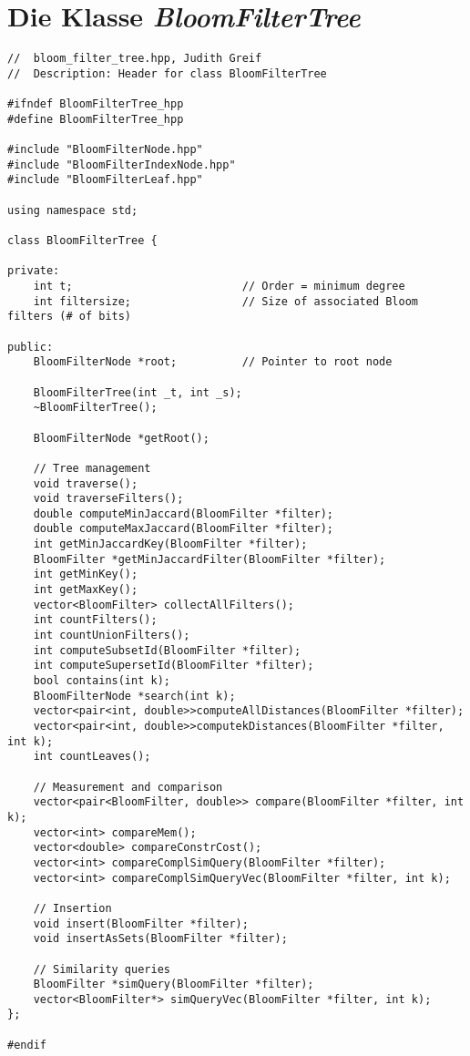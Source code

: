 \section{Die Klasse \textit{BloomFilterTree}}\label{sec:BloomFilterTree.hpp}
\small{
\begin{verbatim}
//  bloom_filter_tree.hpp, Judith Greif
//  Description: Header for class BloomFilterTree

#ifndef BloomFilterTree_hpp
#define BloomFilterTree_hpp

#include "BloomFilterNode.hpp"
#include "BloomFilterIndexNode.hpp"
#include "BloomFilterLeaf.hpp"

using namespace std;

class BloomFilterTree {
    
private:
    int t;                          // Order = minimum degree
    int filtersize;                 // Size of associated Bloom filters (# of bits)
    
public:
    BloomFilterNode *root;          // Pointer to root node
    
    BloomFilterTree(int _t, int _s);
    ~BloomFilterTree();
    
    BloomFilterNode *getRoot();
    
    // Tree management
    void traverse();
    void traverseFilters();
    double computeMinJaccard(BloomFilter *filter);
    double computeMaxJaccard(BloomFilter *filter);
    int getMinJaccardKey(BloomFilter *filter);
    BloomFilter *getMinJaccardFilter(BloomFilter *filter);
    int getMinKey();
    int getMaxKey();
    vector<BloomFilter> collectAllFilters();
    int countFilters();
    int countUnionFilters(); 
    int computeSubsetId(BloomFilter *filter);
    int computeSupersetId(BloomFilter *filter);
    bool contains(int k);
    BloomFilterNode *search(int k);
    vector<pair<int, double>>computeAllDistances(BloomFilter *filter);
    vector<pair<int, double>>computekDistances(BloomFilter *filter, int k);
    int countLeaves(); 
    
    // Measurement and comparison
    vector<pair<BloomFilter, double>> compare(BloomFilter *filter, int k);
    vector<int> compareMem();
    vector<double> compareConstrCost();
    vector<int> compareComplSimQuery(BloomFilter *filter);
    vector<int> compareComplSimQueryVec(BloomFilter *filter, int k);
    
    // Insertion
    void insert(BloomFilter *filter);
    void insertAsSets(BloomFilter *filter);
    
    // Similarity queries
    BloomFilter *simQuery(BloomFilter *filter);
    vector<BloomFilter*> simQueryVec(BloomFilter *filter, int k);
};

#endif
\end{verbatim}
}
